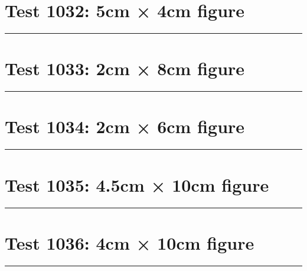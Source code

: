 \documentclass[a4paper,11pt]{article}
\begin{document}
\section*{Test 1032: 5cm × 4cm figure}
\begin{swarmwrap}%
  \begin{minipage}[t]{5cm}
    \centering
    \rule{\linewidth}{4cm}
  \end{minipage}%
\end{swarmwrap}%
\swarmwrapnext
\lipsum[126]
\lipsum[127]
\lipsum[128]
\lipsum[129]
\lipsum[130]
\lipsum[131]
\section*{Test 1033: 2cm × 8cm figure}
\begin{swarmwrap}%
  \begin{minipage}[t]{2cm}
    \centering
    \rule{\linewidth}{8cm}
  \end{minipage}%
\end{swarmwrap}%
\swarmwrapnext
\lipsum[13]
\lipsum[14]
\lipsum[15]
\lipsum[16]
\lipsum[17]
\lipsum[18]
\section*{Test 1034: 2cm × 6cm figure}
\begin{swarmwrap}%
  \begin{minipage}[t]{2cm}
    \centering
    \rule{\linewidth}{6cm}
  \end{minipage}%
\end{swarmwrap}%
\swarmwrapnext
\lipsum[5]
\lipsum[6]
\lipsum[7]
\lipsum[8]
\lipsum[9]
\section*{Test 1035: 4.5cm × 10cm figure}
\begin{swarmwrap}%
  \begin{minipage}[t]{4cm}
    \centering
    \rule{\linewidth}{10cm}
  \end{minipage}%
\end{swarmwrap}%
\swarmwrapnext
\lipsum[88]
\lipsum[89]
\lipsum[90]
\lipsum[91]
\section*{Test 1036: 4cm × 10cm figure}
\begin{swarmwrap}%
  \begin{minipage}[t]{4cm}
    \centering
    \rule{\linewidth}{10cm}
  \end{minipage}%
\end{swarmwrap}%
\swarmwrapnext
\lipsum[112]
\lipsum[113]
\lipsum[114]
\end{document}
